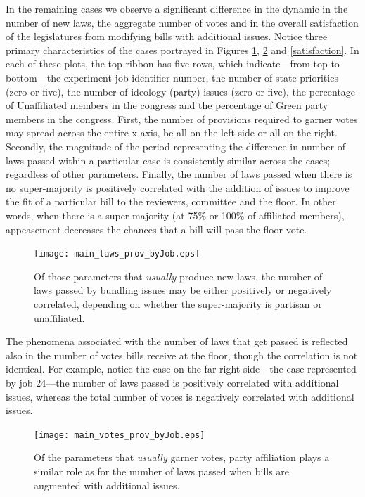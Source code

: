 \documentclass[pdftex,12pt]{llncs}
\begin{document}
In the remaining cases we observe a significant difference in the dynamic in the number of new laws, the aggregate number of votes and in the overall satisfaction of the legislatures from modifying bills with additional issues.
Notice three primary characteristics of the cases portrayed in Figures \ref{numlaws}, \ref{numvotes} and \ref{satisfaction}. 
In each of these plots, the top ribbon has five rows, which indicate---from top-to-bottom---the experiment job identifier number, the number of state priorities (zero or five), the number of ideology (party) issues (zero or five), the percentage of Unaffiliated members in the congress and the percentage of Green party members in the congress.
First, the number of provisions required to garner votes may spread across the entire x axis, be all on the left side or all on the right. 
Secondly, the magnitude of the period representing the difference in number of laws passed within a particular case is consistently similar across the cases; regardless of other parameters. 
Finally, the number of laws passed when there is no super-majority is positively correlated with the addition of issues to improve the fit of a particular bill to the reviewers, committee and the floor. 
In other words, when there is a super-majority (at 75\% or 100\% of affiliated members), appeasement decreases the chances that a bill will pass the floor vote.


\begin{figure}%
 \centering
  \texttt{[image: main\_laws\_prov\_byJob.eps]}
\caption[ ]{Of those parameters that \textit{usually} produce new laws, the number of laws passed by bundling issues may be either positively or negatively correlated, depending on whether the super-majority is partisan or unaffiliated.}
 \label{numlaws}
\end{figure}

The phenomena associated with the number of laws that get passed is reflected also in the number of votes bills receive at the floor, though the correlation is not identical. 
For example, notice the case on the far right side---the case represented by job 24---the number of laws passed is positively correlated with additional issues, whereas the total number of votes is negatively correlated with additional issues. 


\begin{figure}%
 \centering
  \texttt{[image: main\_votes\_prov\_byJob.eps]}
\caption[ ]{Of the parameters that \textit{usually} garner votes, party affiliation plays a similar role as for the number of laws passed when bills are augmented with additional issues.}
 \label{numvotes}
\end{figure}
\end{document}
